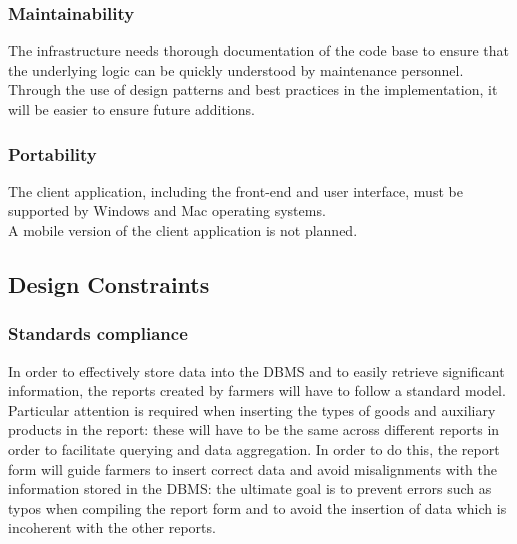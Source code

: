 \documentclass[10pt]{article}
\begin{document}
\subsubsection{Maintainability}
The infrastructure needs thorough documentation of the code base to ensure that the underlying logic can be quickly understood by maintenance personnel.\\
Through the use of design patterns and best practices in the implementation, it will be easier to ensure future additions.
\subsubsection{Portability}
The client application, including the front-end and user interface, must be supported by Windows and Mac operating systems. \\
A mobile version of the client application is not planned.
\subsection{Design Constraints}
\subsubsection{Standards compliance}
In order to effectively store data into the DBMS and to easily retrieve significant information, the reports created by farmers will have to follow a standard model.
Particular attention is required when inserting the types of goods and auxiliary products in the report: these will have to be the same across different reports in order
to facilitate querying and data aggregation. In order to do this, the report form will guide farmers to insert correct data and avoid misalignments with the information stored 
in the DBMS: the ultimate goal is to prevent errors such as typos when compiling the report form and to avoid the insertion of data which is incoherent with the other reports. 
\end{document}
